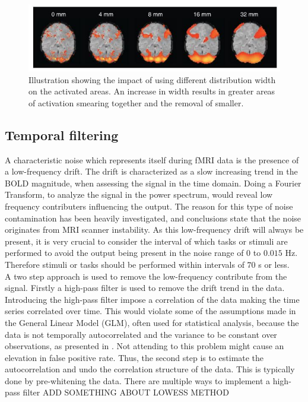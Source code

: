 \begin{figure}[H]                 
	\includegraphics[width=.8\textwidth]{figures/aBackground/smooth}  
	\caption{Illustration showing the impact of using different distribution width on the activated areas. An increase in width results in greater areas of activation smearing together and the removal of smaller. \cite{Poldrack2011}}
	\label{fig:back:smooth} 
\end{figure}  

\subsection{Temporal filtering}

A characteristic noise which represents itself during fMRI data is the presence of a low-frequency drift. The drift is characterized as a slow increasing trend in the BOLD magnitude, when assessing the signal in the time domain. Doing a Fourier Transform, to analyze the signal in the power spectrum, would reveal low frequency contributers influencing the output. The reason for this type of noise contamination has been heavily investigated, and conclusions state that the noise originates from MRI scanner instability. As this low-frequency drift will always be present, it is very crucial to consider the interval of which tasks or stimuli are performed to avoid the output being present in the noise range of $0$ to $0.015$ Hz. Therefore stimuli or tasks should be performed within intervals of $70$ s or less. \cite{Poldrack2011} \\
A two step approach is used to remove the low-frequency contribute from the signal. Firstly a high-pass filter is used to remove the drift trend in the data. Introducing the high-pass filter impose a correlation of the data making the time series correlated over time. This would violate some of the assumptions made in the General Linear Model (GLM), often used for statistical analysis, because the data is not temporally autocorrelated and the variance to be constant over observations, as presented in . Not attending to this problem might cause an elevation in false positive rate. Thus, the second step is to estimate the autocorrelation and undo the correlation structure of the data. This is typically done by pre-whitening the data. There are multiple ways to implement a high-pass filter ADD SOMETHING ABOUT LOWESS METHOD \cite{Poldrack2011}